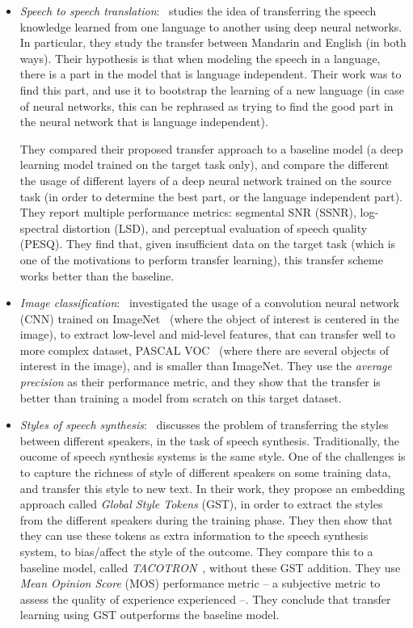\begin{itemize}
    \item \textit{Speech to speech translation}:~\citep{xu2014cross} studies the idea of transferring the speech knowledge learned from one language to another using deep neural networks. In particular, they study the transfer between Mandarin and English (in both ways). Their hypothesis is that when modeling the speech in a language, there is a part in the model that is language independent. Their work was to find this part, and use it to bootstrap the learning of a new language (in case of neural networks, this can be rephrased as trying to find the good part in the neural network that is language independent).

    They compared their proposed transfer approach to a baseline model (a deep learning model trained on the target task only), and compare the different the usage of different layers of a deep neural network trained on the source task (in order to determine the best part, or the language independent part). They report multiple performance metrics: segmental SNR (SSNR), log-spectral distortion (LSD), and perceptual evaluation of speech quality (PESQ). They find that, given insufficient data on the target task (which is one of the motivations to perform transfer learning), this transfer scheme works better than the baseline.

    \item \textit{Image classification}:~\citep{oquab2014learning} investigated the usage of a convolution neural network (CNN) trained on ImageNet~\citep{imagenet_cvpr09} (where the object of interest is centered in the image), to extract low-level and mid-level features, that can transfer well to more complex dataset, PASCAL VOC~\citep{everingham2010pascal} (where there are several objects of interest in the image), and is smaller than ImageNet. They use the \textit{average precision} as their performance metric, and they show that the transfer is better than training a model from scratch on this target dataset.

    \item \textit{Styles of speech synthesis}:~\citep{wang2018style} discusses the problem of transferring the styles between different speakers, in the task of speech synthesis. Traditionally, the oucome of speech synthesis systems is the same style. One of the challenges is to capture the richness of style of different speakers on some training data, and transfer this style to new text. In their work, they propose an embedding approach called \textit{Global Style Tokens} (GST), in order to extract the styles from the different speakers during the training phase. They then show that they can use these tokens as extra information to the speech synthesis system, to bias/affect the style of the outcome.
    They compare this to a baseline model, called \textit{TACOTRON}~\citep{wang2017tacotron}, without these GST addition. They use \textit{Mean Opinion Score} (MOS) performance metric -- a subjective metric to assess the quality of experience experienced --. They conclude that transfer learning using GST outperforms the baseline model.

  \end{itemize}

